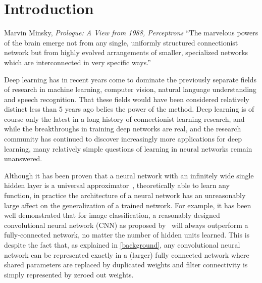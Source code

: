 \documentclass[thesis]{subfiles}
\begin{document}

\chapter{Introduction}  %

\begin{chapquote}{Marvin Minsky, \textit{Prologue: A View from 1988, Perceptrons}}
``The marvelous powers of the brain emerge not from any single, uniformly structured connectionist network but from highly evolved arrangements of smaller, specialized networks which are interconnected in very specific ways.''
\end{chapquote}

Deep learning has in recent years come to dominate the previously separate fields of research in machine learning, computer vision, natural language understanding and speech recognition. That these fields would have been considered relatively distinct less than 5 years ago belies the power of the method. Deep learning is of course only the latest in a long history of connectionist learning research, and while the breakthroughs in training deep networks are real, and the research community has continued to discover increasingly more applications for deep learning, many relatively simple questions of learning in neural networks remain unanswered.

Although it has been proven that a neural network with an infinitely wide single hidden layer is a universal approximator~\citep{journals/mcss/Cybenko92,hornik89a},  theoretically able to learn any function, in practice the architecture of a neural network has an unreasonably large affect on the generalization of a trained network. For example, it has been well demonstrated that for image classification, a reasonably designed convolutional neural network (CNN) as proposed by~\citet{Lecun1998} will always outperform a fully-connected network, no matter the number of hidden units learned. This is despite the fact that, as explained in \cref{background}, any convolutional neural network can be represented exactly in a (larger) fully connected network where shared parameters are replaced by duplicated weights and filter connectivity is simply represented by zeroed out weights.
\end{document}
